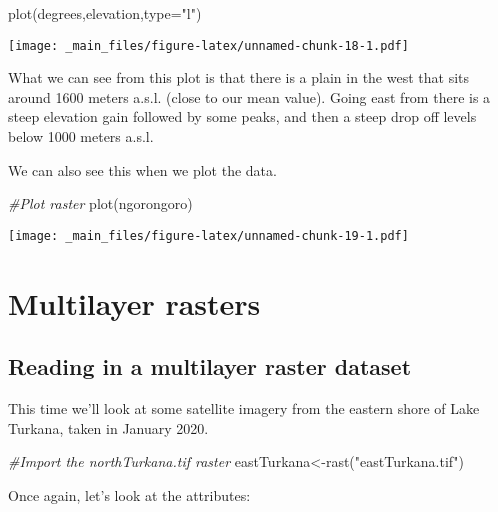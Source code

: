 \documentclass[
]{book}
\newenvironment{Shaded}{\begin{snugshade}}{\end{snugshade}}
\newcommand{\AttributeTok}[1]{\textcolor[rgb]{0.77,0.63,0.00}{#1}}
\newcommand{\CommentTok}[1]{\textcolor[rgb]{0.56,0.35,0.01}{\textit{#1}}}
\newcommand{\FunctionTok}[1]{\textcolor[rgb]{0.00,0.00,0.00}{#1}}
\newcommand{\NormalTok}[1]{#1}
\newcommand{\OtherTok}[1]{\textcolor[rgb]{0.56,0.35,0.01}{#1}}
\newcommand{\StringTok}[1]{\textcolor[rgb]{0.31,0.60,0.02}{#1}}
\begin{document}
\begin{Shaded}
\begin{Highlighting}[]
\FunctionTok{plot}\NormalTok{(degrees,elevation,}\AttributeTok{type=}\StringTok{"l"}\NormalTok{)}
\end{Highlighting}
\end{Shaded}

\texttt{[image: \_main\_files/figure-latex/unnamed-chunk-18-1.pdf]}

What we can see from this plot is that there is a plain in the west that sits around 1600 meters a.s.l. (close to our mean value). Going east from there is a steep elevation gain followed by some peaks, and then a steep drop off levels below 1000 meters a.s.l.

We can also see this when we plot the data.

\begin{Shaded}
\begin{Highlighting}[]
\CommentTok{\#Plot raster}
\FunctionTok{plot}\NormalTok{(ngorongoro)}
\end{Highlighting}
\end{Shaded}

\texttt{[image: \_main\_files/figure-latex/unnamed-chunk-19-1.pdf]}

\hypertarget{multilayer-rasters}{%
\chapter{Multilayer rasters}\label{multilayer-rasters}}

\hypertarget{reading-in-a-multilayer-raster-dataset}{%
\section{Reading in a multilayer raster dataset}\label{reading-in-a-multilayer-raster-dataset}}

This time we'll look at some satellite imagery from the eastern shore of Lake Turkana, taken in January 2020.

\begin{Shaded}
\begin{Highlighting}[]
\CommentTok{\#Import the northTurkana.tif raster }
\NormalTok{eastTurkana}\OtherTok{\textless{}{-}}\FunctionTok{rast}\NormalTok{(}\StringTok{"eastTurkana.tif"}\NormalTok{)}
\end{Highlighting}
\end{Shaded}

Once again, let's look at the attributes:
\end{document}
